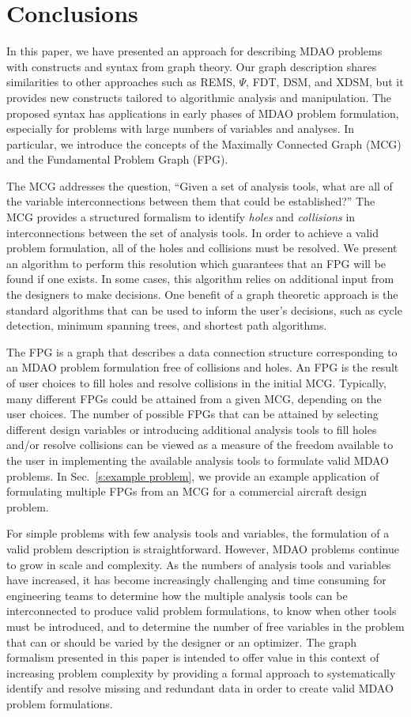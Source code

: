 \section*{Conclusions}
In this paper, we have presented an approach for describing MDAO problems with constructs and syntax from graph theory. 
Our graph description shares similarities to other approaches such as REMS, $\Psi$, FDT, 
DSM, and XDSM, but it provides new constructs tailored to algorithmic analysis and 
manipulation. The proposed syntax has applications in early phases of MDAO problem 
formulation, especially for problems with large numbers of variables and analyses. 
In particular, we introduce the concepts of the Maximally Connected Graph (MCG) and 
the Fundamental Problem Graph (FPG). 

The MCG addresses the question, ``Given a set of analysis tools, 
what are all of the variable interconnections between them that could be established?''  
The MCG provides a structured formalism to identify \textit{holes} and 
\textit{collisions} in interconnections between the set of analysis tools. 
In order to achieve a valid problem formulation, all of the holes and collisions must 
be resolved. We present an algorithm to perform this resolution which guarantees that an FPG will be found if one exists. In some cases, this algorithm relies on additional input from the 
designers to make decisions. One benefit of a graph theoretic approach is the standard 
algorithms that can be used to inform the user's decisions, such as cycle detection, 
minimum spanning trees, and shortest path algorithms.

The FPG is a graph that describes a data connection structure corresponding 
to an MDAO problem formulation free of collisions and holes. 
An FPG is the result of user choices to fill holes and resolve collisions in 
the initial MCG. Typically, many different FPGs could be attained from a given MCG, 
depending on the user choices. The number of possible FPGs that can be attained by 
selecting different design variables or introducing additional analysis tools to 
fill holes and/or resolve collisions can be viewed as a measure of the freedom 
available to the user in implementing the available analysis tools to 
formulate valid MDAO problems. In Sec.~\ref{s:example problem}, 
we provide an example application of formulating multiple FPGs from an MCG 
for a commercial aircraft design problem. 

For simple problems with few analysis tools and variables, the formulation of a 
valid problem description is straightforward. However, MDAO problems continue to 
grow in scale and complexity. As the numbers of analysis tools and variables have 
increased, it has become increasingly challenging and time consuming for engineering 
teams to determine how the multiple analysis tools can be interconnected to produce 
valid problem formulations, to know when other tools must be introduced, and to 
determine the number of free variables in the problem that can or should be 
varied by the designer or an optimizer. The graph formalism presented in this 
paper is intended to offer value in this context of increasing problem complexity by 
providing a formal approach to systematically identify and resolve missing and 
redundant data in order to create valid MDAO problem formulations.  